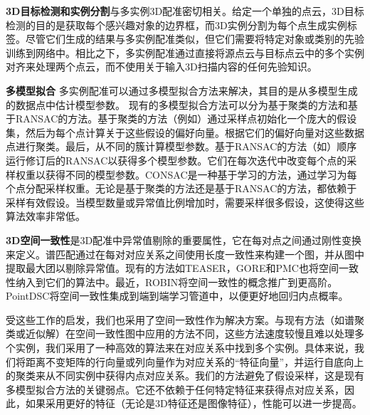 \textbf{3D目标检测和实例分割}与多实例3D配准密切相关。给定一个单独的点云，3D目标检测\cite{VoteNet}的目的是获取每个感兴趣对象的边界框，而3D实例分割\cite{SGPN, Occuseg}为每个点生成实例标签。尽管它们生成的结果\cite{avetisyan2019end, Scenecad}与多实例配准类似，但它们需要将特定对象或类别的先验训练到网络中。相比之下，多实例配准通过直接将源点云与目标点云中的多个实例对齐来处理两个点云，而不使用关于输入3D扫描内容的任何先验知识。

\textbf{多模型拟合}
多实例配准可以通过多模型拟合方法来解决，其目的是从多模型生成的数据点中估计模型参数。
现有的多模型拟合方法可以分为基于聚类的方法和基于RANSAC的方法。基于聚类的方法（例如\cite{Tlinkage, RPA, Coverage}）通过采样点初始化一个庞大的假设集，然后为每个点计算关于这些假设的偏好向量。根据它们的偏好向量对这些数据点进行聚类。最后，从不同的簇计算模型参数。基于RANSAC的方法（如\cite{PEARL, MultiX, ProgressiveX, MCT, CONSAC, ProgressiveX2}）顺序运行修订后的RANSAC以获得多个模型参数。它们在每次迭代中改变每个点的采样权重以获得不同的模型参数。CONSAC\cite{CONSAC}是一种基于学习的方法，通过学习为每个点分配采样权重。无论是基于聚类的方法还是基于RANSAC的方法，都依赖于采样有效假设。当模型数量或异常值比例增加时，需要采样很多假设，这使得这些算法效率非常低。

\textbf{3D空间一致性}是3D配准中异常值剔除的重要属性，它在每对点之间通过刚性变换来定义。谱匹配\cite{leordeanu2005spectral}通过在每对对应关系之间使用长度一致性来构建一个图，并从图中提取最大团以剔除异常值。现有的方法如TEASER\cite{TEASER}，GORE\cite{bustos2017guaranteed}和PMC\cite{parra2019practical}也将空间一致性纳入到它们的算法中。最近，ROBIN\cite{shi2021robin}将空间一致性的概念推广到更高阶。PointDSC\cite{PointDSC}将空间一致性集成到端到端学习管道中，以便更好地回归内点概率。

受这些工作的启发，我们也采用了空间一致性作为解决方案。与现有方法（如谱聚类\cite{leordeanu2005spectral}或近似解\cite{shi2021robin}）在空间一致性图中应用的方法不同，这些方法速度较慢且难以处理多个实例，我们采用了一种高效的算法来在对应关系中找到多个实例。具体来说，我们将距离不变矩阵的行向量或列向量作为对应关系的“特征向量”，并运行自底向上的聚类来从不同实例中获得内点对应关系。我们的方法避免了假设采样，这是现有多模型拟合方法的关键弱点。它还不依赖于任何特定特征来获得点对应关系，因此，如果采用更好的特征（无论是3D特征还是图像特征），性能可以进一步提高。






